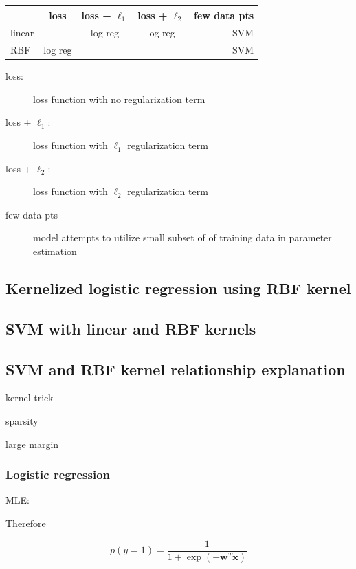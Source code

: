 \documentclass[letterpaper, 12pt]{article}
\newcommand{\vect}[1]{\boldsymbol{#1}}
\begin{document}
\begin{center}
  \begin{tabular}{l|c|c|c|r|}
         & loss & loss + $\ell_1$ & loss + $\ell_2$ & few data pts \\
\hline
  linear &         & log reg  & log reg  & SVM \\
\hline
  RBF    & log reg &          &          & SVM \\
\hline
\end{tabular}
\end{center}

\begin{description}
\item[loss:] loss function with no regularization term \\
\item[loss + $\ell_1$:] loss function with $\ell_1$ regularization term \\
\item[loss + $\ell_2$:] loss function with $\ell_2$ regularization term
\item[few data pts] model attempts to utilize small subset of of training data in parameter estimation 
\end{description}

\subsection{Kernelized logistic regression using RBF kernel}

\subsection{SVM with linear and RBF kernels}

\subsection{SVM and RBF kernel relationship explanation}

kernel trick

sparsity

large margin



\subsubsection{Logistic regression}

MLE:

Therefore

\begin{equation*}
  p(y = 1) = \frac{1}{1 + \exp\left(-\vect{w}^T\vect{x}\right)}
\end{equation*}
\end{document}
